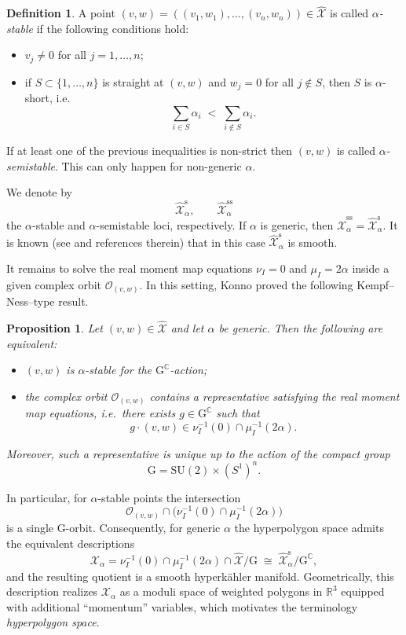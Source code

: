\documentclass[12pt,a4paper]{amsart}
\newtheorem{proposition}[theorem]{Proposition}
\theoremstyle{definition}
\newtheorem{definition}[theorem]{Definition}
\theoremstyle{remark}
\newcommand{\R}{\mathbb R}
\newcommand{\C}{\mathbb C}
\begin{document}
\begin{definition}
A point $(v,w)=((v_1,w_1),\dots,(v_n,w_n))\in\hat{\mathcal X}$
is called \emph{$\alpha$-stable} if the following conditions hold:
\begin{itemize}
\item $v_j\neq0$ for all $j=1,\dots,n$;
\item if $S\subset\{1,\dots,n\}$ is straight at $(v,w)$ and $w_j=0$ for all
$j\notin S$, then $S$ is $\alpha$-short, i.e.
\[
\sum_{i\in S}\alpha_i \;<\; \sum_{i\notin S}\alpha_i.
\]
\end{itemize}
If at least one of the previous
inequalities is non-strict
then $(v,w)$ is called \emph{$\alpha$-semistable}.
This can only happen for non-generic $\alpha$.
\end{definition}
We denote by
\[
\hat{\mathcal X}_\alpha^{\mathrm{s}},
\qquad
\hat{\mathcal X}_\alpha^{\mathrm{ss}}
\]
the $\alpha$-stable and $\alpha$-semistable loci, respectively.
If $\alpha$ is generic, then
$\hat{\mathcal X}_\alpha^{\mathrm{ss}}=\hat{\mathcal X}_\alpha^{\mathrm{s}}$.
It is known (see \cite{GoMa} and references therein) that in this case
$\hat{\mathcal X}_\alpha^{\mathrm{s}}$ is smooth.

It remains to solve the real moment map equations 
$\nu_I=0$ and $\mu_I=2\alpha$ 
inside a given complex orbit \(\mathcal O_{(v,w)}\).
In this setting, Konno \cite{Konno2} proved the following Kempf--Ness--type result.


\begin{proposition}\label{prop:HK-KN}
Let $(v,w)\in \hat{\mathcal X}$ and let $\alpha$ be generic.
Then the following are equivalent:
\begin{itemize}
\item $(v,w)$ is $\alpha$-stable for the $\mathrm{G}^\C$-action;
\item the complex orbit $\mathcal O_{(v,w)}$ contains a representative satisfying
the real moment map equations, i.e.\ there exists $g\in \mathrm{G}^\C$ such that
\[
g\cdot(v,w)\in \nu_I^{-1}(0)\cap\mu_I^{-1}(2\alpha).
\]
\end{itemize}
Moreover, such a representative is unique up to the action of the compact group
\[
\mathrm{G}=\mathrm{SU}(2)\times(S^1)^n.
\]
\end{proposition}

In particular, for $\alpha$-stable points the intersection
\[
\mathcal O_{(v,w)}\cap\bigl(\nu_I^{-1}(0)\cap\mu_I^{-1}(2\alpha)\bigr)
\]
is a single $\mathrm{G}$-orbit.
Consequently, for generic $\alpha$ the hyperpolygon space admits the equivalent
descriptions
\[
\mathcal X_\alpha
=
\nu_I^{-1}(0)\cap\mu_I^{-1}(2\alpha)\cap\hat{\mathcal X}\big/\mathrm{G}
\;\cong\;
\hat{\mathcal X}_\alpha^{\mathrm{s}}\big/\mathrm{G}^\C,
\]
and the resulting quotient is a smooth hyperk\"ahler manifold.
Geometrically, this description realizes $\mathcal X_\alpha$ as a moduli space of
weighted polygons in $\R^3$ equipped with additional ``momentum'' variables,
which motivates the terminology \emph{hyperpolygon space}.
\end{document}
